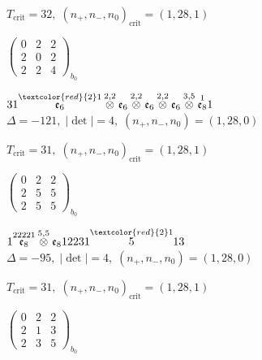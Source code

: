 \documentclass[10pt]{article}
\begin{document}
\hspace{1em}$T_{\text{crit}}=32,\; (n_+,n_-,n_0)_{\text{crit}}=(1,28,1)$

\hspace{2em}$\left(\begin{smallmatrix}0 & 2 & 2 \\ 2 & 0 & 2 \\ 2 & 2 & 4\end{smallmatrix}\right)_{\!b_0}$

\smallskip

$31\overset{\textcolor{red}{2}1}{\mathfrak{e}_6}\overset{2,2}{\otimes}\mathfrak{e}_6\overset{2,2}{\otimes}\mathfrak{e}_6\overset{2,2}{\otimes}\mathfrak{e}_6\overset{3,5}{\otimes}\overset{1}{\mathfrak{e}_8}1$ \quad $\Delta=-121,\; |\det|=4,\; (n_+,n_-,n_0)=(1,28,0)$

\hspace{1em}$T_{\text{crit}}=31,\; (n_+,n_-,n_0)_{\text{crit}}=(1,28,1)$

\hspace{2em}$\left(\begin{smallmatrix}0 & 2 & 2 \\ 2 & 5 & 5 \\ 2 & 5 & 5\end{smallmatrix}\right)_{\!b_0}$

\smallskip

$1\overset{22221}{\mathfrak{e}_8}\overset{5,5}{\otimes}\mathfrak{e}_812231\overset{\textcolor{red}{2}1}{5}13$ \quad $\Delta=-95,\; |\det|=4,\; (n_+,n_-,n_0)=(1,28,0)$

\hspace{1em}$T_{\text{crit}}=31,\; (n_+,n_-,n_0)_{\text{crit}}=(1,28,1)$

\hspace{2em}$\left(\begin{smallmatrix}0 & 2 & 2 \\ 2 & 1 & 3 \\ 2 & 3 & 5\end{smallmatrix}\right)_{\!b_0}$

\smallskip
\end{document}

